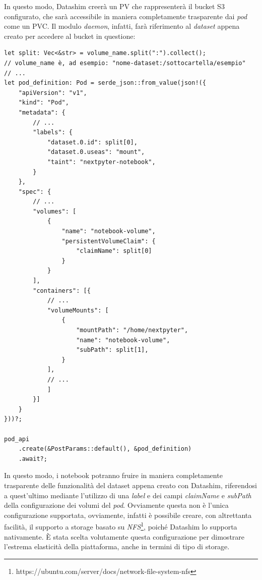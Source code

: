 In questo modo, Datashim creerà un PV che rappresenterà il bucket S3 configurato, che sarà accessibile in maniera completamente trasparente dai \textit{pod} come un PVC. Il modulo \textit{daemon}, infatti, farà riferimento al \textit{dataset} appena creato per accedere al bucket in questione:
\begin{verbatim}
let split: Vec<&str> = volume_name.split(":").collect();
// volume_name è, ad esempio: "nome-dataset:/sottocartella/esempio"
// ...
let pod_definition: Pod = serde_json::from_value(json!({
    "apiVersion": "v1",
    "kind": "Pod",
    "metadata": { 
        // ...
        "labels": {
            "dataset.0.id": split[0],
            "dataset.0.useas": "mount",
            "taint": "nextpyter-notebook",
        }
    },
    "spec": {
        // ... 
        "volumes": [
            {
                "name": "notebook-volume",
                "persistentVolumeClaim": {
                    "claimName": split[0]
                }
            }
        ],
        "containers": [{
            // ...
            "volumeMounts": [
                {
                    "mountPath": "/home/nextpyter",
                    "name": "notebook-volume",
                    "subPath": split[1],
                }
            ],
            // ...
            ]
        }] 
    }
}))?;

pod_api
    .create(&PostParams::default(), &pod_definition)
    .await?;
\end{verbatim}
In questo modo, i notebook potranno fruire in maniera completamente trasparente delle funzionalità del dataset appena creato con Datashim, riferendosi a quest'ultimo mediante l'utilizzo di una \textit{label} e dei campi \textit{claimName} e \textit{subPath} della configurazione dei volumi del \textit{pod}.
\newline
Ovviamente questa non è l'unica configurazione supportata, ovviamente, infatti è possibile creare, con altrettanta facilità, il supporto a storage basato su \textit{NFS}\footnote{https://ubuntu.com/server/docs/network-file-system-nfs}, poiché Datashim lo supporta nativamente. È stata scelta volutamente questa configurazione per dimostrare l'estrema elasticità della piattaforma, anche in termini di tipo di storage. 
\newpage
